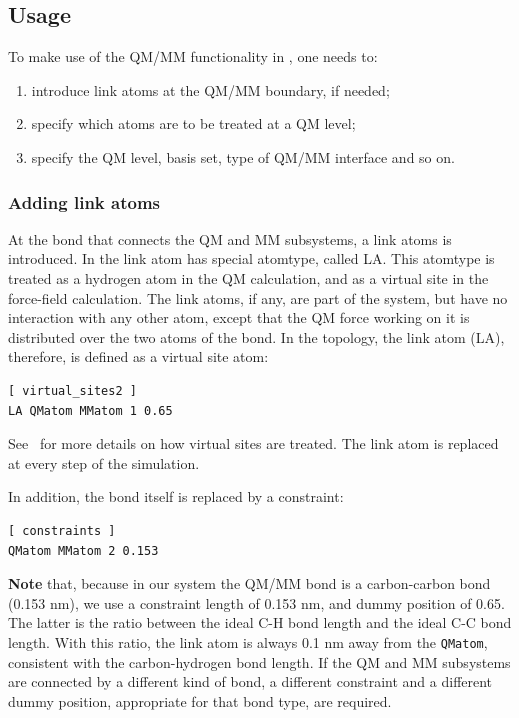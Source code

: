 \subsection{Usage}

To make use of the QM/MM functionality in {\gromacs}, one needs to:

\begin{enumerate}
\item introduce link atoms at the QM/MM boundary, if needed;
\item specify which atoms are to be treated at a QM level;
\item specify the QM level, basis set, type of QM/MM interface and so on. 
\end{enumerate}

\subsubsection{Adding link atoms}

At the bond that connects the QM and MM subsystems, a link atoms is
introduced.  In {\gromacs} the link atom has special atomtype, called
LA. This atomtype is treated as a hydrogen atom in the QM calculation,
and as a virtual site in the force-field calculation. The link atoms, if
any, are part of the system, but have no interaction with any other
atom, except that the QM force working on it is distributed over the
two atoms of the bond. In the topology, the link atom (LA), therefore,
is defined as a virtual site atom:

{\small
\begin{verbatim}
[ virtual_sites2 ]
LA QMatom MMatom 1 0.65
\end{verbatim}}

See~ for more details on how virtual sites are
treated. The link atom is replaced at every step of the simulation.

In addition, the bond itself is replaced by a constraint:

{\small
\begin{verbatim}
[ constraints ]
QMatom MMatom 2 0.153
\end{verbatim}}

{\bf Note} that, because in our system the QM/MM bond is a carbon-carbon
bond (0.153 nm), we use a constraint length of 0.153 nm, and dummy
position of 0.65. The latter is the ratio between the ideal C-H
bond length and the ideal C-C bond length. With this ratio, the link
atom is always 0.1 nm away from the {\tt QMatom}, consistent with the
carbon-hydrogen bond length. If the QM and MM subsystems are connected
by a different kind of bond, a different constraint and a different
dummy position, appropriate for that bond type, are required.

